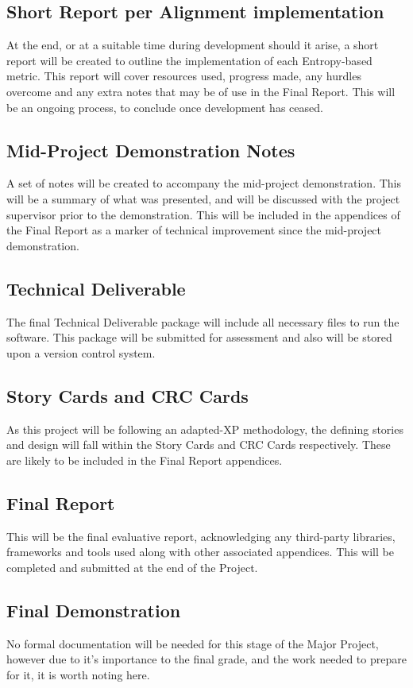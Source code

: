 \documentclass[11pt,fleqn,twoside]{article}
\begin{document}
\subsection{Short Report per Alignment implementation}
At the end, or at a suitable time during development should it arise, a short report will be created to outline the implementation of each Entropy-based metric. This report will cover resources used, progress made, any hurdles overcome and any extra notes that may be of use in the Final Report. This will be an ongoing process,  to conclude once development has ceased.

\subsection{Mid-Project Demonstration Notes}
A set of notes will be created to accompany the mid-project demonstration. This will be a summary of what was presented, and will be discussed with the project supervisor prior to the demonstration. This will be included in the appendices of the Final Report as a marker of technical improvement since the mid-project demonstration.

\subsection{Technical Deliverable}
The final Technical Deliverable package will include all necessary files to run the software. This package will be submitted for assessment and also will be stored upon a version control system.

\subsection{Story Cards and CRC Cards}
As this project will be following an adapted-XP methodology, the defining stories and design will fall within the Story Cards and CRC Cards respectively. These are likely to be included in the Final Report appendices.

\subsection{Final Report}
This will be the final evaluative report, acknowledging any third-party libraries, frameworks and tools used along with other associated appendices. This will be completed and submitted at the end of the Project.

\subsection{Final Demonstration}
No formal documentation will be needed for this stage of the Major Project, however due to it's importance to the final grade, and the work needed to prepare for it, it is worth noting here.
\end{document}
